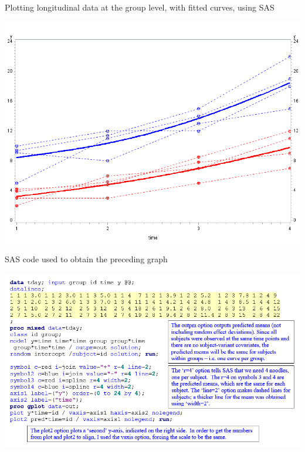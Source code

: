 \documentclass[
  9pt,
  ignorenonframetext,
]{beamer}
\begin{document}
\begin{frame}{Plotting longitudinal data at the group level, with fitted
curves, using SAS}
\protect\hypertarget{plotting-longitudinal-data-at-the-group-level-with-fitted-curves-using-sas}{}
\tiny

\begin{center}\includegraphics[width=0.6\linewidth]{figs_L2/L2-f1} \end{center}

\tiny
\end{frame}

\begin{frame}{SAS code used to obtain the preceding graph}
\protect\hypertarget{sas-code-used-to-obtain-the-preceding-graph}{}
\tiny

\begin{center}\includegraphics[width=1\linewidth]{figs_L2/L2-f2} \end{center}

\tiny
\end{frame}
\end{document}
